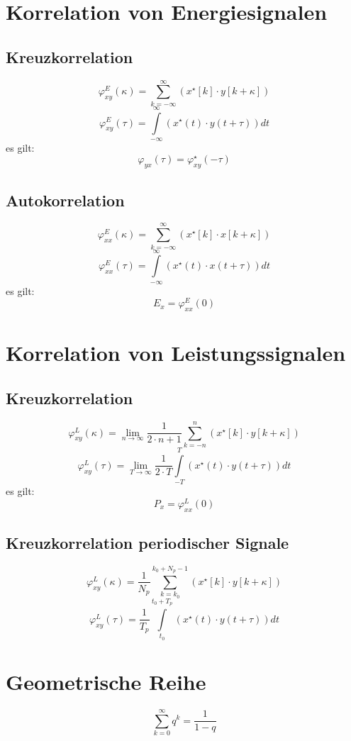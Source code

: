 \documentclass[a4paper, 10pt, fleqn]{article}
\begin{document}
\section{Korrelation von Energiesignalen}

\subsection{Kreuzkorrelation}
\[ \varphi_{xy}^{E} (\kappa) = \sum\limits_{k = -\infty}^{\infty} \left(x^\star[k] \cdot y[k + \kappa]\right) \]
\[ \varphi_{xy}^{E} (\tau) = \int\limits_{-\infty}^{\infty} \left(x^\star(t) \cdot y(t + \tau)\right) dt \]
es gilt: 
\[ \varphi_{yx}(\tau) = \varphi_{xy}^\star(-\tau) \]

\subsection{Autokorrelation}
\[ \varphi_{xx}^{E} (\kappa) = \sum\limits_{k = -\infty}^{\infty} \left(x^\star[k] \cdot x[k + \kappa]\right) \]
\[ \varphi_{xx}^{E} (\tau) = \int\limits_{-\infty}^{\infty} \left(x^\star(t) \cdot x(t + \tau)\right) dt \]
es gilt: 
\[ E_x = \varphi_{xx}^{E} (0) \]

\section{Korrelation von Leistungssignalen}

\subsection{Kreuzkorrelation}
\[ \varphi_{xy}^{L} (\kappa) = \lim\limits_{n \to \infty} \frac{1}{2 \cdot n + 1} \sum\limits_{k = -n}^{n} \left(x^\star[k] \cdot y[k + \kappa]\right) \]
\[ \varphi_{xy}^{L} (\tau) = \lim\limits_{T \to \infty} \frac{1}{2 \cdot T} \int\limits_{-T}^{T} \left(x^\star(t) \cdot y(t + \tau)\right) dt \]
es gilt: 
\[ P_x = \varphi_{xx}^{L} (0) \]

\subsection{Kreuzkorrelation periodischer Signale}
\[ \varphi_{xy}^{L} (\kappa) = \frac{1}{N_p} \sum\limits_{k = k_0}^{k_0 + N_p - 1} \left(x^\star[k] \cdot y[k + \kappa]\right) \]
\[ \varphi_{xy}^{L} (\tau) = \frac{1}{T_p} \int\limits_{t_0}^{t_0 + T_p} \left(x^\star(t) \cdot y(t + \tau)\right) dt \]

\section{Geometrische Reihe}
\[ \sum\limits_{k = 0}^{\infty} q^k = \frac{1}{1 - q} \]
\end{document}
